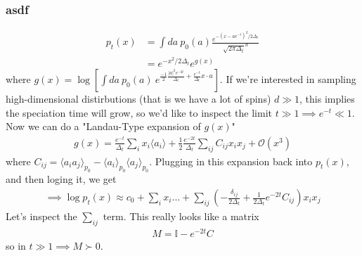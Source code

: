 \subsubsection{asdf}
\begin{align}
	p_t(x) &  = \int da~ p_0(a) \frac{e^{-(x - ae^{-t})^2/2\Delta_t}}{\sqrt{2\pi \Delta_t}^d}\\
	& =  e^{-x^2/2\Delta_t}  e^{g(x)}
\end{align}
where $g(x) = \log \left [\int da ~ p_0(a) ~ e^{\frac{-1}{2} \frac{|a|^2 e^{-2t}}{\Delta_t} + \frac{e^{-t}}{\Delta_t} x\cdot a} \right]$. If we're interested in sampling high-dimensional distirbutions (that is we have a lot of spins) $d \gg 1$, this implies the speciation time will grow, so we'd like to inspect the limit $t \gg 1 \implies e^{-t} \ll 1$. Now we can do a "Landau-Type expansion of $g(x)$"
\begin{align}
	g(x) = \frac{e^{-t}}{\Delta_t} \sum_i x_i \langle a_i\rangle + \frac{1}{2} \frac{e^{-2t}}{\Delta_t} \sum_{ij} C_{ij} x_i x_j + \mathcal O(x^3)
\end{align}
where $C_{ij} = \langle a_i a_j \rangle_{p_0} - \langle a_i \rangle_{p_0} \langle a_j \rangle_{p_0}$. Plugging in this expansion back into $p_t(x)$, and then loging it, we get
\begin{align}
	\implies \log p_t(x) \approx c_0 + \sum_i x_i ... + \sum_{ij} \left ( - \frac{\delta_{ij}}{2 \Delta_t} + \frac{1}{2 \Delta_t} e^{-2t} C_{ij}\right) x_i x_j
\end{align}
Let's inspect the $\sum_{ij}$ term. This really looks like a matrix
\begin{align}
	M = \mathbb I - e^{-2t} C
\end{align}
so in $t \gg 1 \implies M \succ 0$. 



















